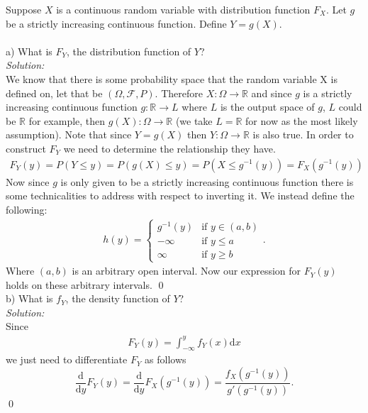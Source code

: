 \documentclass[10pt]{amsart}
\newcommand{\D}{\mathrm{d}}
\begin{document}
 Suppose $X$ is a continuous random variable with distribution function $F_X$. Let $g$ be a strictly increasing continuous function. Define $Y=g(X)$. \\ \\
\noindent
a) What is $F_Y$, the distribution function of $Y$? \\
\textit{Solution:} \\
We know that there is some probability space that the random variable X is defined on, let that be $(\Omega, \mathcal{F},P)$.
Therefore $X: \Omega \rightarrow \mathbb{R}$ and since $g$ is a strictly increasing continuous function $g: \mathbb{R} \rightarrow L$ where $L$ is the output space of $g$, $L$ could be $\mathbb{R}$ for example, then $g(X): \Omega \rightarrow \mathbb{R}$ (we take $L = \mathbb{R}$ for now as the most likely assumption).
Note that since $Y = g(X)$ then $Y: \Omega \rightarrow \mathbb{R}$ is also true.
In order to construct $F_Y$ we need to determine the relationship they have.
\begin{eqnarray*}
F_Y(y) = P(Y \leq y) = P(g(X) \leq y) = P(X \leq g^{-1}(y)) = F_X(g^{-1}(y))
\end{eqnarray*}
Now since $g$ is only given to be a strictly increasing continuous function there is some technicalities to address with respect to inverting it.
We instead define the following:
\begin{align*}
h(y) = 
\left\{
    \begin{array}{lr}
        g^{-1}(y) & \text{if } y \in (a, b) \\
        -\infty & \text{if }  y \leq a \\
        \infty & \text{if } y \geq b
    \end{array}
\right..
\end{align*}
Where $(a, b)$ is an arbitrary open interval. Now our expression for $F_Y(y)$ holds on these arbitrary intervals.
\qed \\

\noindent
b) What is $f_Y$, the density function of $Y$? \\
\textit{Solution:} \\
Since
\begin{align*}
F_Y(y) = \int_{-\infty}^y f_Y(x) \D x
\end{align*}
we just need to differentiate $F_Y$ as follows \\
$$
\frac{\D}{\D y} F_Y(y) = \frac{\D}{\D y} F_X(g^{-1}(y)) = \frac{f_X(g^{-1}(y))}{g\prime(g^{-1}(y))}.
$$
\qed
\\
\end{document}
